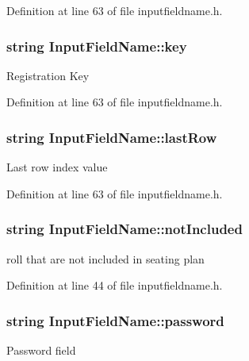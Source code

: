 \-Definition at line 63 of file inputfieldname.\-h.

\hypertarget{classInputFieldName_a26cffcb455cb1b977aa60b68c5b48fe4}{
\subsubsection[{key}]{\setlength{\rightskip}{0pt plus 5cm}string {\bf \-Input\-Field\-Name\-::key}}}\label{dd/db2/classInputFieldName_a26cffcb455cb1b977aa60b68c5b48fe4}
\-Registration \-Key 

\-Definition at line 63 of file inputfieldname.\-h.

\hypertarget{classInputFieldName_a12e0f0ec0ad7962271d6dae576e5ee0a}{
\subsubsection[{last\-Row}]{\setlength{\rightskip}{0pt plus 5cm}string {\bf \-Input\-Field\-Name\-::last\-Row}}}\label{dd/db2/classInputFieldName_a12e0f0ec0ad7962271d6dae576e5ee0a}
\-Last row index value 

\-Definition at line 63 of file inputfieldname.\-h.

\hypertarget{classInputFieldName_a9ee6ee84737e1199bdfd9fb24c82c2c7}{
\subsubsection[{not\-Included}]{\setlength{\rightskip}{0pt plus 5cm}string {\bf \-Input\-Field\-Name\-::not\-Included}}}\label{dd/db2/classInputFieldName_a9ee6ee84737e1199bdfd9fb24c82c2c7}
roll that are not included in seating plan 

\-Definition at line 44 of file inputfieldname.\-h.

\hypertarget{classInputFieldName_a318f819ef4663d7e5f40d91180093cb9}{
\subsubsection[{password}]{\setlength{\rightskip}{0pt plus 5cm}string {\bf \-Input\-Field\-Name\-::password}}}\label{dd/db2/classInputFieldName_a318f819ef4663d7e5f40d91180093cb9}
\-Password field 

